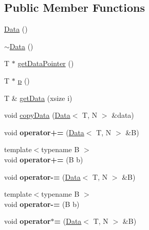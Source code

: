\subsection*{Public Member Functions}
\begin{DoxyCompactItemize}
\item 
\hyperlink{class_x_1_1_data_a9ad5f351292008abe819ecaad1e3c94d}{Data} ()
\item 
\hyperlink{class_x_1_1_data_a2b21e425670199f07a7e264b24f69214}{$\sim$\-Data} ()
\item 
T $\ast$ \hyperlink{class_x_1_1_data_a085e20937e473698958910dfe31780aa}{get\-Data\-Pointer} ()
\item 
T $\ast$ \hyperlink{class_x_1_1_data_ac3fd035b3814e662ef527a00034f947d}{p} ()
\item 
T \& \hyperlink{class_x_1_1_data_a9a0a3e674daebe2750d8d7f233e7d0ce}{get\-Data} (xsize i)
\item 
void \hyperlink{class_x_1_1_data_ac9e98c6fbdfdd23b664e6ac610fd672a}{copy\-Data} (\hyperlink{class_x_1_1_data}{Data}$<$ T, N $>$ \&data)
\item 
\hypertarget{class_x_1_1_data_a8c1665070bafded63fcd3bc3f7afbff2}{void {\bfseries operator+=} (\hyperlink{class_x_1_1_data}{Data}$<$ T, N $>$ \&B)}\label{class_x_1_1_data_a8c1665070bafded63fcd3bc3f7afbff2}

\item 
\hypertarget{class_x_1_1_data_a53b2f3843000d2f71386a02644e40784}{{\footnotesize template$<$typename B $>$ }\\void {\bfseries operator+=} (B b)}\label{class_x_1_1_data_a53b2f3843000d2f71386a02644e40784}

\item 
\hypertarget{class_x_1_1_data_a9dd49ecafa28bec173a1d5af0fee2a3e}{void {\bfseries operator-\/=} (\hyperlink{class_x_1_1_data}{Data}$<$ T, N $>$ \&B)}\label{class_x_1_1_data_a9dd49ecafa28bec173a1d5af0fee2a3e}

\item 
\hypertarget{class_x_1_1_data_a153fccaadec2bf9da88caa7e31b8a3f5}{{\footnotesize template$<$typename B $>$ }\\void {\bfseries operator-\/=} (B b)}\label{class_x_1_1_data_a153fccaadec2bf9da88caa7e31b8a3f5}

\item 
\hypertarget{class_x_1_1_data_a837aad97f0179a95de5c768e19ce9272}{void {\bfseries operator$\ast$=} (\hyperlink{class_x_1_1_data}{Data}$<$ T, N $>$ \&B)}\label{class_x_1_1_data_a837aad97f0179a95de5c768e19ce9272}


\end{DoxyCompactItemize}
